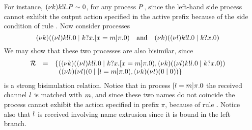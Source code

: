 For instance, $(\nu k)k!l.P\sim 0$, for any process $P$, since the left-hand side process cannot exhibit the output action specified in the active prefix because of the side condition of rule . Now consider processes
%
\begin{equation}\label{eq:bismilarity_matching}
(\nu k)((\nu l)k!l.0 \;|\; k?x.[ x = m ]\pi.0) \quad \text{and} \quad (\nu k)((\nu l)k!l.0 \;|\; k?x.0)
\end{equation}
%
We may show that these two processes are also bisimilar, since 
\[
\begin{array}{rcl}
{\cal R} & = &
\{
((\nu k)((\nu l)k!l.0 \;|\; k?x.[ x = m ]\pi.0),  (\nu k)((\nu l)k!l.0 \;|\; k?x.0))\\
& & \;\; ((\nu k)(\nu l)(0 \;|\; [ l = m ]\pi.0), (\nu k)(\nu l)(0 \;|\;0))
\}
\end{array}
\]
%
is a strong bisimulation relation. Notice that in process $[ l = m ]\pi.0$ the received channel $l$ is matched with $m$, and since these two names do not coincide the process cannot exhibit the action specified in prefix $\pi$, because of rule . Notice also that $l$ is received involving name extrusion since it is bound in the left branch. %
